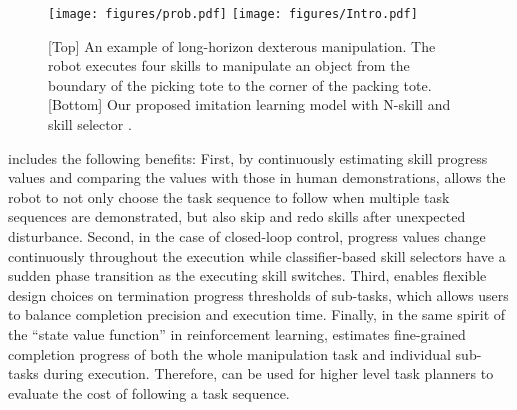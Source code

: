 \begin{figure}[t]
    \centering
    \texttt{[image: figures/prob.pdf]}
   \texttt{[image: figures/Intro.pdf]}
    \caption{[Top] An example of long-horizon dexterous manipulation. The robot executes four skills to manipulate an object from the boundary of the picking tote to the corner of the packing tote. [Bottom] Our proposed imitation learning model \ours with N-skill and skill selector \progss.}
    \label{fig:intro}
\end{figure}
\progss includes the following benefits:
First, by continuously estimating skill progress values and comparing the values with those in human demonstrations, \progss allows the robot to not only choose the task sequence to follow when multiple task sequences are demonstrated, but also skip and redo skills after unexpected disturbance.
Second, in the case of closed-loop control, progress values change continuously throughout the execution while classifier-based skill selectors have a sudden phase transition as the executing skill switches. 
Third, \progss enables flexible design choices on termination progress thresholds of sub-tasks, which allows users to balance completion precision and execution time.
Finally, in the same spirit of the ``state value function'' in reinforcement learning, \progss estimates fine-grained completion progress of both the whole manipulation task and individual sub-tasks during execution. 
Therefore, \progss can be used for higher level task planners to evaluate the cost of following a task sequence.%


